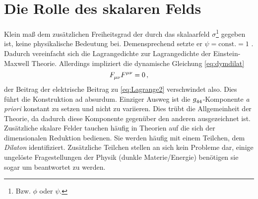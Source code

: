 \section{Die Rolle des skalaren Felds}
  Klein maß dem zusätzlichen Freiheitsgrad der durch das skalaarfeld
  $\sigma$\footnote{Bzw. $\phi$ oder $\psi$.} gegeben ist, keine physikalische
  Bedeutung bei.
  Demensprechend setzte er $\psi=\mathrm{const.}=1$ .
 Dadurch vereinfacht sich die Lagrangedichte zur Lagrangedichte der
 Einstein-Maxwell Theorie. Allerdings impliziert die dynamische Gleichung
 \eqref{eq:dymdilat}
  \begin{equation}
\tensor*{F}{_\mu_\nu}\tensor*{F}{^\mu^\nu}=0\,,
 \end{equation}
 der Beitrag der elektrische Beitrag zu \eqref{eq:Lagrange2} verschwindet also.
 Dies führt die Konstruktion ad absurdum. Einziger Ausweg ist die $\tensor{g}{_4_4}$-Komponente
\emph{a priori} konstant zu setzen und nicht zu variieren. Dies trübt
die Allgemeinheit der Theorie, da dadurch diese Komponente gegenüber den anderen
ausgezeichnet ist. Zusätzliche skalare Felder tauchen häufig in Theorien auf die
sich der dimensionalen Reduktion bedienen. Sie werden häufig mit einem Teilchen,
dem \emph{Dilaton} identifiziert. Zusätzliche Teilchen stellen an sich kein
Probleme dar, einige ungelöste Fragestellungen der Physik (dunkle
Materie/Energie) benötigen sie sogar um beantwortet zu werden. 
